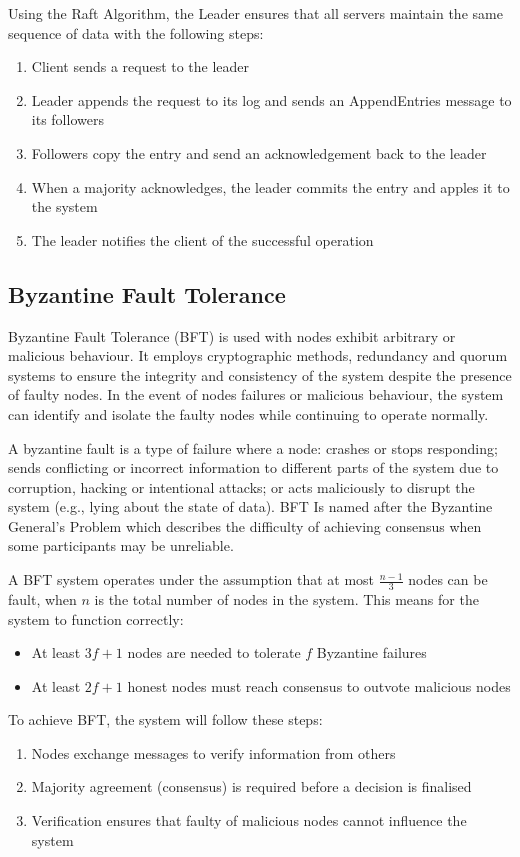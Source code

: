 Using the Raft Algorithm, the Leader ensures that all servers maintain the same sequence of data with the following steps:
\begin{enumerate}
    \item Client sends a request to the leader
    \item Leader appends the request to its log  and sends an AppendEntries message to its followers
    \item Followers copy the entry and send an acknowledgement back to the leader
    \item When a majority acknowledges, the leader commits the entry and apples it to the system
    \item The leader notifies the client of the successful operation
\end{enumerate}

\subsection{Byzantine Fault Tolerance}
Byzantine Fault Tolerance (BFT) is used with nodes exhibit arbitrary or malicious behaviour. It employs cryptographic methods, redundancy and quorum systems to ensure the integrity and consistency of the system despite the presence of faulty nodes. In the event of nodes failures or malicious behaviour, the system can identify and isolate the faulty nodes while continuing to operate normally. 

A byzantine fault is a type of failure where a node: crashes or stops responding; sends conflicting or incorrect information to different parts of the system due to corruption, hacking or intentional attacks; or acts maliciously to disrupt the system (e.g., lying about the state of data). BFT Is named after the Byzantine General's Problem which describes the difficulty of achieving consensus when some participants may be unreliable. 

A BFT system operates under the assumption that at most $\displaystyle \frac{n-1}{3}$ nodes can be fault, when $n$ is the total number of nodes in the system. This means for the system to function correctly:
\begin{itemize}
    \item At least $3f+1$ nodes are needed to tolerate $f$ Byzantine failures
    \item At least $2f+1$ honest nodes must reach consensus to outvote malicious nodes
\end{itemize}

To achieve BFT, the system will follow these steps:
\begin{enumerate}
    \item Nodes exchange messages to verify information from others
    \item Majority agreement (consensus) is required before a decision is finalised
    \item Verification ensures that faulty of malicious nodes cannot influence the system
\end{enumerate}

